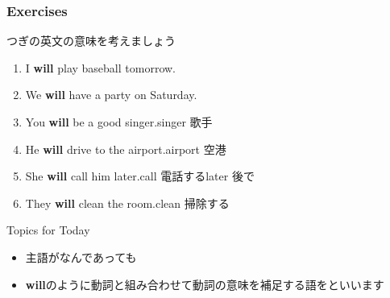 \documentclass[aspectratio=169,xcolor={dvipsnames,table}]{beamer}
\newcommand{\myaudio}[1]{\href{#1}{\faVolumeUp}}
\begin{document}
\begin{frame}[plain]\frametitle{Exercises}

つぎの英文の意味を考えましょう

\begin{enumerate}
 \item I {\bfseries will} play baseball tomorrow.
 \item We  {\bfseries will} have a party on Saturday.
 \item You {\bfseries will} be a good singer.\hfill{\scriptsize singer  歌手}
 \item He {\bfseries will} drive to the airport.\hfill{\scriptsize airport  空港}
 \item She {\bfseries will} call him later.\hfill{\scriptsize call  電話する\hspace{8pt}later  後で}
 \item They {\bfseries will} clean the room.\hfill{\scriptsize clean  掃除する}
\end{enumerate}

\pause

\vfill

\begin{exampleblock}{Topics for Today}
\begin{itemize}[square]\small
 \item   主語がなんであっても\,
 \item {\bfseries will}のように動詞と組み合わせて動詞の意味を補足する語をといいます
 \end{itemize}
     \end{exampleblock}

\mbox{}\hfill{\myaudio{./audio/012_will_02.mp3}} 
\end{frame}
\end{document}
